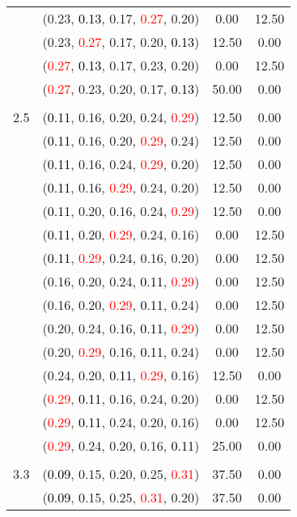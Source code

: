 \documentclass[10pt,a4paper]{report}
\begin{document}
\begin{center}
\begin{longtable}{clcc}
			&(0.23, \textcolor{black}{0.13}, 0.17, \textcolor{red}{0.27}, 0.20)&0.00&12.50\\
			&(0.23, \textcolor{red}{0.27}, 0.17, 0.20, \textcolor{black}{0.13})&12.50&0.00\\
			&(\textcolor{red}{0.27}, \textcolor{black}{0.13}, 0.17, 0.23, 0.20)&0.00&12.50\\
			&(\textcolor{red}{0.27}, 0.23, 0.20, 0.17, \textcolor{black}{0.13})&50.00&0.00\\
		&&&\\
		2.5			&(\textcolor{black}{0.11}, 0.16, 0.20, 0.24, \textcolor{red}{0.29})&12.50&0.00\\
			&(\textcolor{black}{0.11}, 0.16, 0.20, \textcolor{red}{0.29}, 0.24)&12.50&0.00\\
			&(\textcolor{black}{0.11}, 0.16, 0.24, \textcolor{red}{0.29}, 0.20)&12.50&0.00\\
			&(\textcolor{black}{0.11}, 0.16, \textcolor{red}{0.29}, 0.24, 0.20)&12.50&0.00\\
			&(\textcolor{black}{0.11}, 0.20, 0.16, 0.24, \textcolor{red}{0.29})&12.50&0.00\\
			&(\textcolor{black}{0.11}, 0.20, \textcolor{red}{0.29}, 0.24, 0.16)&0.00&12.50\\
			&(\textcolor{black}{0.11}, \textcolor{red}{0.29}, 0.24, 0.16, 0.20)&0.00&12.50\\
			&(0.16, 0.20, 0.24, \textcolor{black}{0.11}, \textcolor{red}{0.29})&0.00&12.50\\
			&(0.16, 0.20, \textcolor{red}{0.29}, \textcolor{black}{0.11}, 0.24)&0.00&12.50\\
			&(0.20, 0.24, 0.16, \textcolor{black}{0.11}, \textcolor{red}{0.29})&0.00&12.50\\
			&(0.20, \textcolor{red}{0.29}, 0.16, \textcolor{black}{0.11}, 0.24)&0.00&12.50\\
			&(0.24, 0.20, \textcolor{black}{0.11}, \textcolor{red}{0.29}, 0.16)&12.50&0.00\\
			&(\textcolor{red}{0.29}, \textcolor{black}{0.11}, 0.16, 0.24, 0.20)&0.00&12.50\\
			&(\textcolor{red}{0.29}, \textcolor{black}{0.11}, 0.24, 0.20, 0.16)&0.00&12.50\\
			&(\textcolor{red}{0.29}, 0.24, 0.20, 0.16, \textcolor{black}{0.11})&25.00&0.00\\
		&&&\\
		3.3			&(\textcolor{black}{0.09}, 0.15, 0.20, 0.25, \textcolor{red}{0.31})&37.50&0.00\\
			&(\textcolor{black}{0.09}, 0.15, 0.25, \textcolor{red}{0.31}, 0.20)&37.50&0.00\\

\end{longtable}
\end{center}
\end{document}
